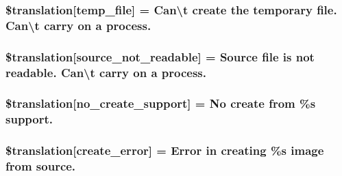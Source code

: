 \subsubsection[{\$translation}]{\setlength{\rightskip}{0pt plus 5cm}\$translation\mbox{[}\textquotesingle{}temp\+\_\+file\textquotesingle{}\mbox{]} = \textquotesingle{}Can\textbackslash{}\textquotesingle{}t create the temporary file. Can\textbackslash{}\textquotesingle{}t carry on a process.\textquotesingle{}}\label{class_8upload_8xx___x_x_8php_a2baece8da11e20d45175db91851ec3e3}
\hypertarget{class_8upload_8xx___x_x_8php_a922967ca2df0efdd455261142d8e5715}{}
\subsubsection[{\$translation}]{\setlength{\rightskip}{0pt plus 5cm}\$translation\mbox{[}\textquotesingle{}source\+\_\+not\+\_\+readable\textquotesingle{}\mbox{]} = \textquotesingle{}Source file is not readable. Can\textbackslash{}\textquotesingle{}t carry on a process.\textquotesingle{}}\label{class_8upload_8xx___x_x_8php_a922967ca2df0efdd455261142d8e5715}
\hypertarget{class_8upload_8xx___x_x_8php_a346dfd1ade29f583dd20d345c436859f}{}
\subsubsection[{\$translation}]{\setlength{\rightskip}{0pt plus 5cm}\$translation\mbox{[}\textquotesingle{}no\+\_\+create\+\_\+support\textquotesingle{}\mbox{]} = \textquotesingle{}No create from \%s support.\textquotesingle{}}\label{class_8upload_8xx___x_x_8php_a346dfd1ade29f583dd20d345c436859f}
\hypertarget{class_8upload_8xx___x_x_8php_a53013ce9255c4e1849098ddd9fdb2b3f}{}
\subsubsection[{\$translation}]{\setlength{\rightskip}{0pt plus 5cm}\$translation\mbox{[}\textquotesingle{}create\+\_\+error\textquotesingle{}\mbox{]} = \textquotesingle{}Error in creating \%s image from source.\textquotesingle{}}\label{class_8upload_8xx___x_x_8php_a53013ce9255c4e1849098ddd9fdb2b3f}
\hypertarget{class_8upload_8xx___x_x_8php_a6ab0a660b457eaf2d3434b225449fdd6}{}
